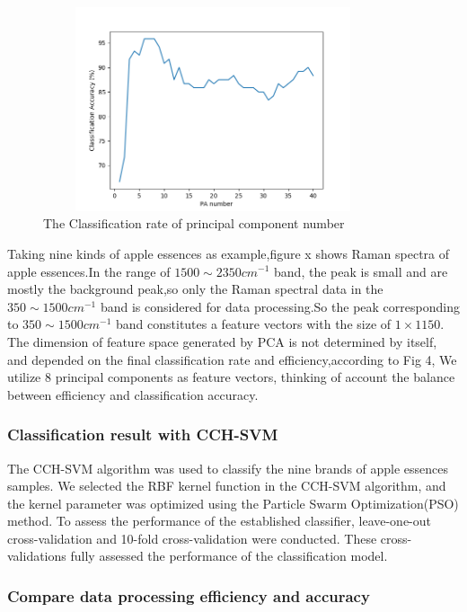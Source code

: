 \documentclass[a4paper]{article}
\begin{document}
    \begin{figure}[h]
  \centering
  \includegraphics[width=10cm,height=6cm]{Figure_3}
  \caption{ The Classification rate of principal component number }
\end{figure}
Taking nine kinds of apple essences as example,figure x shows Raman spectra of apple essences.In the range of $1500 \sim  2350 cm^{-1}$ band, the peak is small and are mostly the background peak,so only the Raman spectral data in the $350 \sim 1500 cm^{-1}$ band is considered for data processing.So the peak corresponding to $ 350 \sim 1500 cm^{-1}$ band constitutes a feature vectors with the size of $ 1\times 1150 $.
The dimension of feature space generated by PCA is not determined by itself, and depended on the final classification rate and efficiency,according to Fig 4, We utilize 8 principal components as feature vectors, thinking of account the balance between efficiency and classification accuracy.

    \subsubsection{Classification result with CCH-SVM}



The CCH-SVM algorithm was used to classify the nine brands of apple essences samples. We selected the RBF kernel function in the CCH-SVM algorithm, and the kernel parameter was optimized using the Particle Swarm Optimization(PSO) method. To assess the performance of the established classifier, leave-one-out cross-validation and 10-fold cross-validation were conducted. These cross-validations fully assessed the performance of the classification model.




    \subsubsection{Compare data processing efficiency and accuracy}
\end{document}
